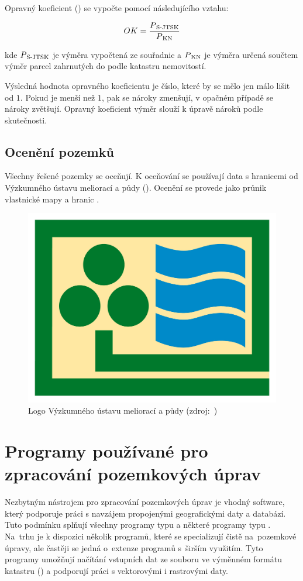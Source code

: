 Opravný koeficient () se vypočte pomocí následujícího vztahu:

\begin{equation}
	OK = \frac{P\textsubscript{S-JTSK}}{P\textsubscript{KN}}
\end{equation}

kde \(\displaystyle P\textsubscript{S-JTSK} \) je výměra  vypočtená ze souřadnic a \(\displaystyle P\textsubscript{KN} \) je výměra  určená součtem výměr parcel zahrnutých do  podle katastru nemovitostí.

Výsledná hodnota opravného koeficientu je číslo, které by se mělo jen málo lišit od  \(\displaystyle 1 \). Pokud je  menší než \(\displaystyle 1 \), pak se nároky zmenšují, v opačném případě se nároky zvětšují. Opravný koeficient výměr slouží k úpravě nároků podle skutečnosti.

\subsection{Ocenění pozemků}
\label{oceneni}

Všechny řešené pozemky se oceňují. K oceňování se používají data s hranicemi  od Výzkumného ústavu meliorací a půdy (). Ocenění se provede jako průnik vlastnické mapy a hranic .

	\begin{figure}[H]
		\centering
		\includegraphics[width=.5\textwidth]{./pictures/vumop.jpg}
		\caption[Zpracování nároku]{Logo Výzkumného ústavu meliorací a půdy (zdroj:~\citep{vumop})}
		\label{fig:pozem-obrazek}
 	\end{figure}

\section{Programy používané pro zpracování pozemkových úprav}
\label{programy_pu}

Nezbytným nástrojem pro zpracování pozemkových úprav je vhodný software, který podporuje práci s navzájem propojenými geografickými daty a databází. Tuto podmínku splňují všechny programy typu  a některé programy typu . Na~trhu je k dispozici několik programů, které se specializují čistě na~pozemkové úpravy, ale častěji se jedná o~extenze programů s~širším využitím. Tyto programy umožňují načítání vstupních dat ze souboru ve výměnném formátu katastru () a podporují práci s vektorovými i rastrovými daty.

